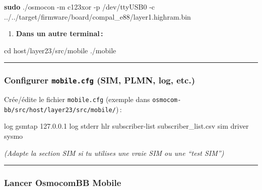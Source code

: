 \documentclass[
]{article}
\newenvironment{Shaded}{\begin{snugshade}}{\end{snugshade}}
\newcommand{\AttributeTok}[1]{\textcolor[rgb]{0.13,0.29,0.53}{#1}}
\newcommand{\BuiltInTok}[1]{#1}
\newcommand{\DataTypeTok}[1]{\textcolor[rgb]{0.13,0.29,0.53}{#1}}
\newcommand{\ExtensionTok}[1]{#1}
\newcommand{\FunctionTok}[1]{\textcolor[rgb]{0.13,0.29,0.53}{\textbf{#1}}}
\newcommand{\NormalTok}[1]{#1}
\providecommand{\tightlist}{%
  \setlength{\itemsep}{0pt}\setlength{\parskip}{0pt}}
\begin{document}
\begin{Shaded}
\begin{Highlighting}[]
\FunctionTok{sudo}\NormalTok{ ./osmocon }\AttributeTok{{-}m}\NormalTok{ c123xor }\AttributeTok{{-}p}\NormalTok{ /dev/ttyUSB0 }\AttributeTok{{-}c}\NormalTok{ ../../target/firmware/board/compal\_e88/layer1.highram.bin}
\end{Highlighting}
\end{Shaded}

\begin{enumerate}
\def\labelenumi{\arabic{enumi}.}
\setcounter{enumi}{3}
\tightlist
\item
  \textbf{Dans un autre terminal\,:}
\end{enumerate}

\begin{Shaded}
\begin{Highlighting}[]
\BuiltInTok{cd}\NormalTok{ host/layer23/src/mobile}
\ExtensionTok{./mobile}
\end{Highlighting}
\end{Shaded}

\begin{center}\rule{0.5\linewidth}{0.5pt}\end{center}

\subsubsection{\texorpdfstring{Configurer \texttt{mobile.cfg} (SIM,
PLMN, log,
etc.)}{Configurer mobile.cfg (SIM, PLMN, log, etc.)}}\label{configurer-mobile.cfg-sim-plmn-log-etc.}

Crée/édite le fichier \texttt{mobile.cfg} (exemple dans
\texttt{osmocom-bb/src/host/layer23/src/mobile/})\,:

\begin{Shaded}
\begin{Highlighting}[]
\DataTypeTok{log gsmtap 127.0.0.1}
\DataTypeTok{log stderr}
\DataTypeTok{hlr}
\DataTypeTok{  subscriber{-}list subscriber\_list.csv}
\DataTypeTok{sim}
\DataTypeTok{  driver sysmo}
\end{Highlighting}
\end{Shaded}

\emph{(Adapte la section SIM si tu utilises une vraie SIM ou une ``test
SIM'')}

\begin{center}\rule{0.5\linewidth}{0.5pt}\end{center}

\subsubsection{Lancer OsmocomBB Mobile}\label{lancer-osmocombb-mobile}
\end{document}
